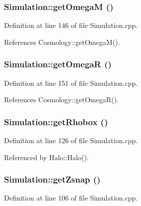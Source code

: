\subsubsection[{getOmegaM}]{ Simulation::getOmegaM ()}\label{classSimulation_a88b23998f2fa5a47ef5f11059b4151c8}


Definition at line 146 of file Simulation.cpp.



References Cosmology::getOmegaM().

\subsubsection[{getOmegaR}]{ Simulation::getOmegaR ()}\label{classSimulation_adf3374ad7de242ada8afaae0218c8058}


Definition at line 151 of file Simulation.cpp.



References Cosmology::getOmegaR().

\subsubsection[{getRhobox}]{ Simulation::getRhobox ()}\label{classSimulation_a56c357d09b09072874e2d48dd45ee178}


Definition at line 126 of file Simulation.cpp.



Referenced by Halo::Halo().

\subsubsection[{getZsnap}]{ Simulation::getZsnap ()}\label{classSimulation_a70be67688cdb92cdadcd21290bd0bb39}


Definition at line 106 of file Simulation.cpp.



